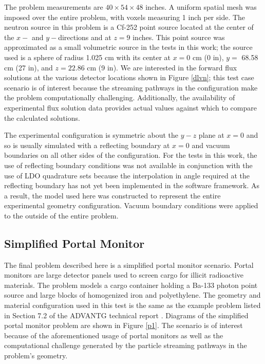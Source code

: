 \documentclass{article} %
\begin{document}
The problem measurements are $40\times54\times48$ inches. A uniform spatial
mesh was imposed over the entire problem, with voxels measuring 1 inch per side.
The neutron source in this problem is a Cf-252 point source located at the 
center of the $x-$ and $y-$directions and at $z = 9$ inches.
This point source was approximated as a small volumetric source in the tests in
this work; the source used is a sphere of radius 1.025 cm with its center at
$x = 0$ cm (0 in), $y =$ 68.58 cm (27 in), and $z = 22.86$ cm (9 in). 
We are interested in the forward flux solutions at the various detector
locations shown in Figure \ref{dlvn}; this test case scenario is of interest 
because the streaming pathways in the configuration make the problem computationally
challenging. Additionally, the availability of experimental flux solution data
provides actual values against which to compare the calculated solutions.

The experimental configuration is symmetric about the $y-z$ plane at $x = 0$
and so is usually simulated with a reflecting boundary at $x = 0$ and vacuum
boundaries on all other sides of the configuration. For the tests in this
work, the use of reflecting boundary conditions was not available in
conjunction with the use of LDO quadrature sets because the interpolation in angle
required at the reflecting boundary has not yet been implemented in the
software framework.  As a result, the model used here was constructed to
represent the entire experimental geometry configuration. Vacuum boundary
conditions were applied to the outside of the entire problem.

\subsection{Simplified Portal Monitor}

The final problem described here is a simplified portal monitor scenario.
Portal monitors are large detector panels used to screen cargo for illicit
radioactive materials. The problem models a cargo container holding a Ba-133
photon point source and large blocks of homogenized iron and polyethylene.
The geometry and material configuration used in this test is the same as the
example problem listed in Section 7.2 of the ADVANTG technical report
\cite{advantg}. Diagrams of the simplified portal monitor problem are shown in
Figure \ref{p1}. The scenario is of interest because of the aforementioned
usage of portal monitors as well as the computational challenge generated by
the particle streaming pathways in the problem's geometry.
\end{document}
